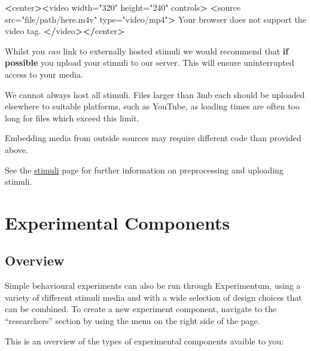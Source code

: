 \documentclass[]{book}
\newenvironment{Shaded}{\begin{snugshade}}{\end{snugshade}}
\newcommand{\StringTok}[1]{\textcolor[rgb]{0.31,0.60,0.02}{#1}}
\newcommand{\OperatorTok}[1]{\textcolor[rgb]{0.81,0.36,0.00}{\textbf{#1}}}
\newcommand{\ErrorTok}[1]{\textcolor[rgb]{0.64,0.00,0.00}{\textbf{#1}}}
\newcommand{\NormalTok}[1]{#1}
\begin{document}
\begin{Shaded}
\begin{Highlighting}[]
\OperatorTok{<}\NormalTok{center}\OperatorTok{>}\ErrorTok{<}\NormalTok{video width=}\StringTok{"320"}\NormalTok{ height=}\StringTok{"240"}\NormalTok{ controls}\OperatorTok{>}
\StringTok{  }\ErrorTok{<}\NormalTok{source src=}\StringTok{"file/path/here.m4v"}\NormalTok{ type=}\StringTok{"video/mp4"}\OperatorTok{>}
\NormalTok{Your browser does not support the video tag.}
\OperatorTok{<}\ErrorTok{/}\NormalTok{video}\OperatorTok{>}\ErrorTok{</}\NormalTok{center}\OperatorTok{>}
\end{Highlighting}
\end{Shaded}

\begin{info}
Whilst you \emph{can} link to externally hosted stimuli we would
recommend that \textbf{if possible} you upload your stimuli to our
server. This will ensure uninterrupted access to your media.

We cannot always host all stimuli. Files larger than 3mb each should be
uploaded elsewhere to suitable platforms, such as YouTube, as loading
times are often too long for files which exceed this limit.

Embedding media from outside sources may require different code than
provided above.
\end{info}

See the \protect\hyperlink{stimuli}{stimuli} page for further
information on preprocessing and uploading stimuli.

\chapter{Experimental Components}\label{experimental-components}

\section{Overview}\label{overview-4}

Simple behavioural experiments can also be run through Experimentum,
using a variety of different stimuli media and with a wide selection of
design choices that can be combined. To create a new experiment
component, navigate to the ``researchers'' section by using the menu on
the right side of the page.

This is an overview of the types of experimental components avaible to
you:
\end{document}
